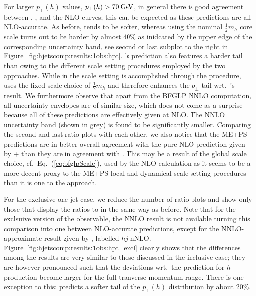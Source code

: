
For larger $p_\perp(h)$ values, $p_\perp(h)>70\text{\:GeV}$, in general there
is good agreement between \Powheg, \MGaMC, \Sherpa and the NLO curves;
this can be expected as these predictions are all NLO-accurate. As
before, \Herwig tends to be softer, whereas \MGaMC using the nominal
$\tfrac{1}{2}m_h$ core scale turns out to be harder by almost 40\% as
inidcated by the upper edge of the corresponding uncertainty band, see
second or last subplot to the right in
Figure~\ref{fig:hjetscomp:results:1obs:hpt}. \Sherpa's \NNLOPS
prediction also features a harder tail than \Powheg owing to the
different scale setting procedures employed by the two approaches.
While in \Powheg the scale setting is accomplished through the \Minlo
procedure, \Sherpa uses the fixed scale choice of $\tfrac{1}{2}m_h$
and therefore enhances the $p_\perp$ tail wrt.~\Powheg's result. We
furthermore observe that apart from the BFGLP NNLO computation, all
uncertainty envelopes are of similar size, which does not come as a
surprise because all of these predictions are effectively given at
NLO. The NNLO uncertainty band (shown in grey) is found to be
significantly smaller. Comparing the second and last ratio plots with
each other, we also notice that the ME+PS predictions are in better
overall agreement with the pure NLO prediction given by \GoSam+\Sherpa
than they are in agreement with \Powheg. This may be a result of the
global scale choice, cf.~Eq.~(\ref{eq:bfglpScale}), used by the NLO
calculation as it seems to be a more decent proxy to the ME+PS local
and dynamical scale setting procedures than it is one to the \Powheg
approach.

For the exclusive one-jet case, we reduce the number of ratio plots
and show only those that display the ratios to \Powheg in the same way
as before. Note that for the exclsuive version of the observable, the
NNLO result is not available turning this comparison into one between
NLO-accurate predictions, except for the NNLO-approximate result given
by \Loopsim, labelled \GoSam $hj$ nNLO.
Figure~\ref{fig:hjetscomp:results:1obs:hpt_excl} clearly shows that
the differences among the results are very similar to those discussed
in the inclusive case; they are however pronounced such that the
deviations wrt.~the \Powheg \NNLOPS prediction for $h$ production
become larger for the full tranverse momentum range. There is one
exception to this: \Loopsim predicts a softer tail of the $p_\perp(h)$
distribution by about 20\%. 

